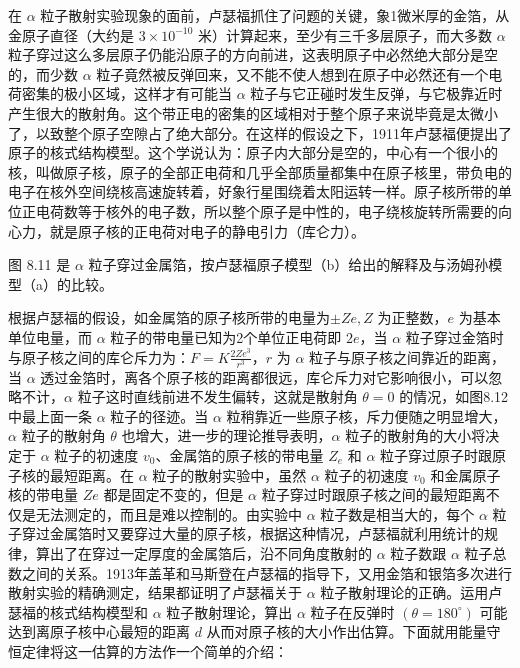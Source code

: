在 \(\alpha\)
粒子散射实验现象的面前，卢瑟福抓住了问题的关键，象1微米厚的金箔，从金原子直径（大约是
\(3 \times 10^{-10}\) 米）计算起来，至少有三千多层原子，而大多数
\(\alpha\)
粒子穿过这么多层原子仍能沿原子的方向前进，这表明原子中必然绝大部分是空的，而少数
\(\alpha\)
粒子竟然被反弹回来，又不能不使人想到在原子中必然还有一个电荷密集的极小区域，这样才有可能当
\(\alpha\)
粒子与它正碰时发生反弹，与它极靠近时产生很大的散射角。这个带正电的密集的区域相对于整个原子来说毕竟是太微小了，以致整个原子空隙占了绝大部分。在这样的假设之下，1911年卢瑟福便提出了原子的核式结构模型。这个学说认为：原子内大部分是空的，中心有一个很小的核，叫做原子核，原子的全部正电荷和几乎全部质量都集中在原子核里，带负电的电子在核外空间绕核高速旋转着，好象行星围绕着太阳运转一样。原子核所带的单位正电荷数等于核外的电子数，所以整个原子是中性的，电子绕核旋转所需要的向心力，就是原子核的正电荷对电子的静电引力（库仑力）。

图 8.11 是 \(\alpha\)
粒子穿过金属箔，按卢瑟福原子模型（b）给出的解释及与汤姆孙模型（a）的比较。

根据卢瑟福的假设，如金属箔的原子核所带的电量为\(\pm Ze, Z\)
为正整数，\(e\) 为基本单位电量，而 \(\alpha\)
粒子的带电量已知为2个单位正电荷即 \(2e\)，当 \(\alpha\)
粒子穿过金箔时与原子核之间的库仑斥力为：\(F = K \frac{2Ze^{3}}{r^{3}}\)，\(r\)
为 \(\alpha\) 粒子与原子核之间靠近的距离，当 \(\alpha\)
透过金箔时，离各个原子核的距离都很远，库仑斥力对它影响很小，可以忽略不计，\(\alpha\)
粒子这时直线前进不发生偏转，这就是散射角 \(\theta = 0\)
的情况，如图8.12中最上面一条 \(\alpha\) 粒子的径迹。当 \(\alpha\)
粒稍靠近一些原子核，斥力便随之明显增大，\(\alpha\) 粒子的散射角
\(\theta\) 也增大，进一步的理论推导表明，\(\alpha\)
粒子的散射角的大小将决定于 \(\alpha\) 粒子的初速度
\(v_0\)、金属箔的原子核的带电量 \(Z_e\) 和 \(\alpha\)
粒子穿过原子时跟原子核的最短距离。在 \(\alpha\) 粒子的散射实验中，虽然
\(\alpha\) 粒子的初速度 \(v_{0}\) 和金属原子核的带电量 \(Ze\)
都是固定不变的，但是 \(\alpha\)
粒子穿过时跟原子核之间的最短距离不仅是无法测定的，而且是难以控制的。由实验中
\(\alpha\) 粒子数是相当大的，每个 \(\alpha\)
粒子穿过金属箔时又要穿过大量的原子核，根据这种情况，卢瑟福就利用统计的规律，算出了在穿过一定厚度的金属箔后，沿不同角度散射的
\(\alpha\) 粒子数跟 \(\alpha\)
粒子总数之间的关系。1913年盖革和马斯登在卢瑟福的指导下，又用金箔和银箔多次进行散射实验的精确测定，结果都证明了卢瑟福关于
\(\alpha\) 粒子散射理论的正确。运用卢瑟福的核式结构模型和 \(\alpha\)
粒子散射理论，算出 \(\alpha\) 粒子在反弹时 \((\theta = 180^{\circ})\)
可能达到离原子核中心最短的距离 \(d\)
从而对原子核的大小作出估算。下面就用能量守恒定律将这一估算的方法作一个简单的介绍：

